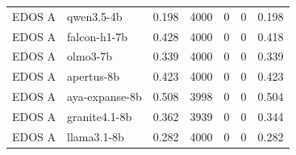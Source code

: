 \begin{table}[t]
\begin{tabular}{llrrrrr}
EDOS A & qwen3.5-4b & 0.198 & 4000 & 0 & 0 & 0.198 \\
EDOS A & falcon-h1-7b & 0.428 & 4000 & 0 & 0 & 0.418 \\
EDOS A & olmo3-7b & 0.339 & 4000 & 0 & 0 & 0.339 \\
EDOS A & apertus-8b & 0.423 & 4000 & 0 & 0 & 0.423 \\
EDOS A & aya-expanse-8b & 0.508 & 3998 & 0 & 0 & 0.504 \\
EDOS A & granite4.1-8b & 0.362 & 3939 & 0 & 0 & 0.344 \\
EDOS A & llama3.1-8b & 0.282 & 4000 & 0 & 0 & 0.282 \\
\bottomrule
\end{tabular}
\end{table}
